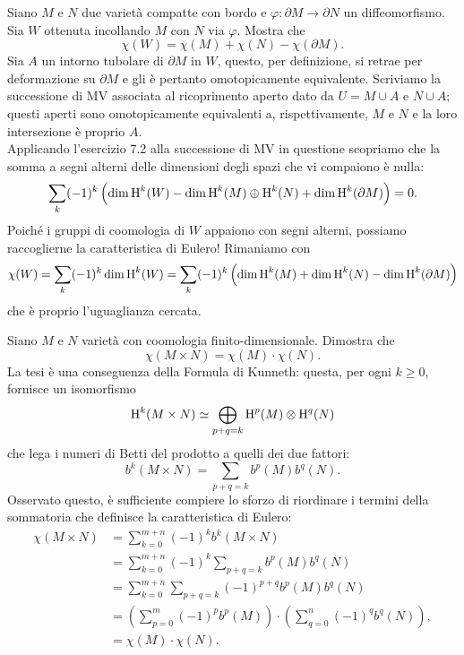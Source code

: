 \documentclass[a4paper]{article}
\begin{document}
\begin{ex}[8.2]{Siano $ M $ e $ N $ due varietà compatte con bordo e $ \varphi: \partial M \to \partial N $ un diffeomorfismo. Sia $ W $ ottenuta incollando $ M $ con $ N $ via $ \varphi $. Mostra che
		\[\chi(W) = \chi(M) + \chi(N) - \chi(\partial M).\]}
	Sia $ A $ un intorno tubolare di $ \partial M $ in $ W $, questo, per definizione, si retrae per deformazione su $ \partial M $ e gli è pertanto omotopicamente equivalente. Scriviamo la successione di MV associata al ricoprimento aperto dato da $ U = M \cup A $ e $ N \cup A $; questi aperti sono omotopicamente equivalenti a, rispettivamente, $ M $ e $ N $ e la loro intersezione è proprio $ A $. \\
	
	Applicando l'esercizio 7.2 alla successione di MV in questione scopriamo che la somma a segni alterni delle dimensioni degli spazi che vi compaiono è nulla:
	\[ \sum_k (-1)^k \left(\dim\operatorname{H}^k(W)- \dim\operatorname{H}^k(M)\oplus\operatorname{H}^k(N) + \dim\operatorname{H}^k(\partial M)\right) = 0 .  \]
	Poiché i gruppi di coomologia di $ W $ appaiono con segni alterni, possiamo raccoglierne la caratteristica di Eulero! Rimaniamo con
	\[ \chi(W) = \sum_k (-1)^k \dim\operatorname{H}^k(W) = \sum_k (-1)^k \left( \dim\operatorname{H}^k(M)+ \dim\operatorname{H}^k(N) - \dim\operatorname{H}^k(\partial M)\right)  \]
	che è proprio l'uguaglianza cercata.
\end{ex}

\begin{ex}[8.3]{Siano $ M $ e $ N $ varietà con coomologia finito-dimensionale. Dimostra che
		\[\chi(M \times N) = \chi(M) \cdot \chi(N).\]}
	La tesi è una conseguenza della Formula di Kunneth: questa, per ogni $ k \geq 0 $, fornisce un isomorfismo 
	\[ \operatorname{H}^k(M \times N) \simeq \bigoplus_{p+q=k} \operatorname{H}^p(M) \otimes \operatorname{H}^q(N) \]
	che lega i numeri di Betti del prodotto a quelli dei due fattori:
	\[ b^k(M \times N) = \sum_{p+q = k} b^p(M) b^q(N). \]
	Osservato questo, è sufficiente compiere lo sforzo di riordinare i termini della sommatoria che definisce la caratteristica di Eulero:
	\begin{align*}
		\chi(M \times N) &=\sum_{k=0}^{m+n} (-1)^kb^k(M \times N)\\
		&= \sum_{k=0}^{m+n} (-1)^k \sum_{p+q = k} b^p(M) b^q(N)\\
		&= \sum_{k=0}^{m+n} \sum_{p+q = k} (-1)^{p+q}b^p(M) b^q(N)\\
		&= \left( \sum_{p=0}^m (-1)^pb^p(M) \right) \cdot \left( \sum_{q=0}^n (-1)^qb^q(N) \right),\\
		&= \chi(M) \cdot \chi(N).
	\end{align*}
\end{ex}
\end{document}
